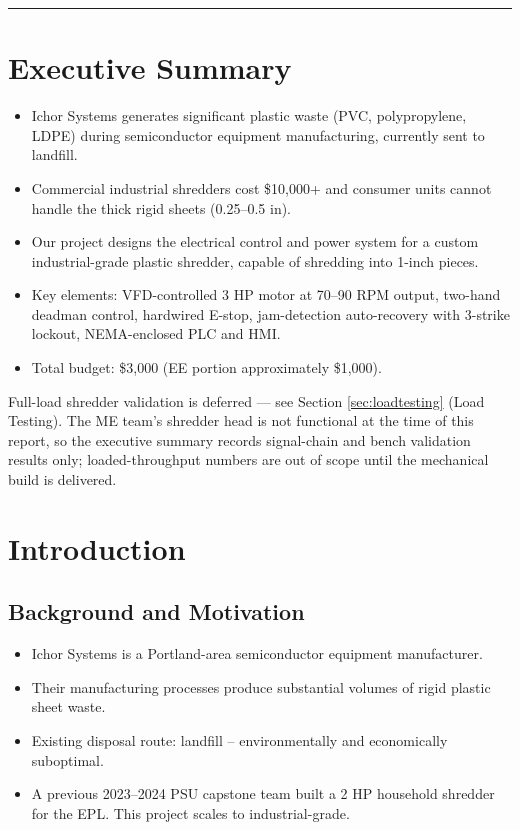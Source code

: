 \documentclass[hidelinks,12pt]{article}
\begin{document}
\noindent\rule{\textwidth}{0.4pt}

\tableofcontents
\newpage

\section{Executive Summary}

\begin{itemize}
    \item Ichor Systems generates significant plastic waste (PVC, polypropylene, LDPE) during semiconductor equipment manufacturing, currently sent to landfill.
    \item Commercial industrial shredders cost \$10,000+ and consumer units cannot handle the thick rigid sheets (0.25--0.5 in).
    \item Our project designs the electrical control and power system for a custom industrial-grade plastic shredder, capable of shredding into 1-inch pieces.
    \item Key elements: VFD-controlled 3 HP motor at 70--90 RPM output, two-hand deadman control, hardwired E-stop, jam-detection auto-recovery with 3-strike lockout, NEMA-enclosed PLC and HMI.
    \item Total budget: \$3,000 (EE portion approximately \$1,000).
\end{itemize}

Full-load shredder validation is deferred — see Section \ref{sec:loadtesting} (Load Testing). The ME team's shredder head is not functional at the time of this report, so the executive summary records signal-chain and bench validation results only; loaded-throughput numbers are out of scope until the mechanical build is delivered.

\section{Introduction}

\subsection{Background and Motivation}
\begin{itemize}
    \item Ichor Systems is a Portland-area semiconductor equipment manufacturer.
    \item Their manufacturing processes produce substantial volumes of rigid plastic sheet waste.
    \item Existing disposal route: landfill -- environmentally and economically suboptimal.
    \item A previous 2023--2024 PSU capstone team built a 2 HP household shredder for the EPL. This project scales to industrial-grade.
\end{itemize}
\end{document}
